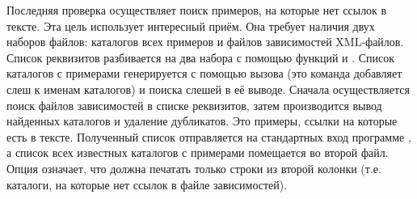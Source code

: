 Последняя проверка осуществляет поиск примеров, на которые нет ссылок
в тексте. Эта цель использует интересный приём. Она требует наличия
двух наборов файлов: каталогов всех примеров и файлов зависимостей
XML-файлов. Список реквизитов разбивается на два набора с помощью
функций  и . Список каталогов с
примерами генерируется с помощью вызова  (это команда
добавляет слеш к именам каталогов) и поиска слешей в её
выводе. Сначала осуществляется поиск файлов зависимостей в списке
реквизитов, затем производится вывод найденных каталогов и удаление
дубликатов. Это примеры, ссылки на которые есть в тексте. Полученный
список отправляется на стандартных вход программе , а
список всех известных каталогов с примерами помещается во второй
файл. Опция  означает, что  должна печатать
только строки из второй колонки (т.е. каталоги, на которые нет ссылок
в файле зависимостей).

